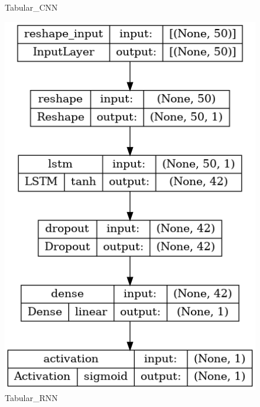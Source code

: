 \begin{figure}[!ht]
\begin{minipage}{0.5\textwidth}
        \caption{Tabular\_CNN}
    \end{minipage}\hfill
    \begin{minipage}{0.5\textwidth}
        \centering
        \includegraphics[width=\linewidth]{obrazky-figures/model-plots/Tabular_RNN.png} %
        \caption{Tabular\_RNN}
    \end{minipage}
\end{figure}
\newpage

